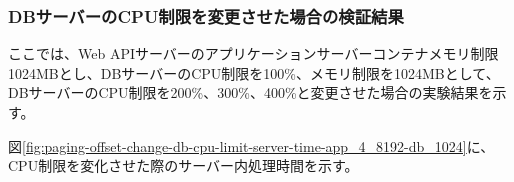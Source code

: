 \documentclass[../../../../main]{subfiles}
\begin{document}
    \subsubsection{DBサーバーのCPU制限を変更させた場合の検証結果}\label{subsubsec:result-paging-offset-change-db-cpu}

    ここでは、Web APIサーバーのアプリケーションサーバーコンテナメモリ制限1024MBとし、DBサーバーのCPU制限を100\%、メモリ制限を1024MBとして、DBサーバーのCPU制限を200\%、300\%、400\%と変更させた場合の実験結果を示す。


    図\ref{fig:paging-offset-change-db-cpu-limit-server-time-app_4_8192-db_1024}に、CPU制限を変化させた際のサーバー内処理時間を示す。

    


    
\end{document}
